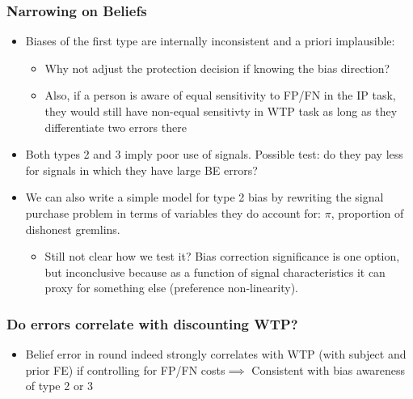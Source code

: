 \documentclass[11pt,hyperref={bookmarks=false}]{beamer}
\begin{document}
\begin{frame}
\frametitle{Narrowing on Beliefs}
\begin{itemize}
\item Biases of the first type are internally inconsistent and a priori implausible:
\begin{itemize}
\item Why not adjust the protection decision if knowing the bias direction?
\item Also, if a person is aware of equal sensitivity to FP/FN in the IP task, they would still have non-equal sensitivty in WTP task as long as they differentiate two errors there
\end{itemize}
\item Both types 2 and 3 imply poor use of signals. Possible test: do they pay less for signals in which they have large BE errors?
\item We can also write a simple model for type 2 bias by rewriting the signal purchase problem in terms of variables they do account for: $\pi$, proportion of dishonest gremlins.
\begin{itemize}
\item Still not clear how we test it? Bias correction significance is one option, but inconclusive because as a function of signal characteristics it can proxy for something else (preference non-linearity).
\end{itemize}

\end{itemize}
\end{frame}







\begin{frame}
\frametitle{Do errors correlate with discounting WTP?}

\begin{itemize}
\item Belief error in round indeed strongly correlates with WTP (with subject and prior FE) if controlling for FP/FN costs$\implies$ Consistent with bias awareness of type 2 or 3 
\end{itemize}
\begin{table}[htbp]
\caption{WTP minus Value of Information: subject-round BE error}

%
\end{table}
\end{frame}
\end{document}
